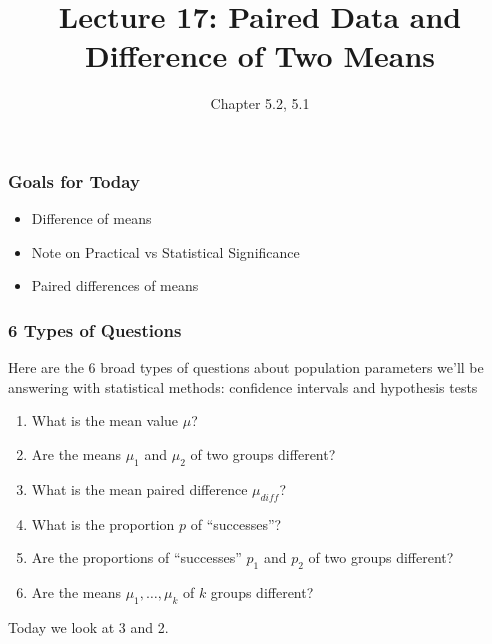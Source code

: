 \documentclass[handout]{beamer}
\title{Lecture 17: Paired Data and Difference of Two Means}
\author{Chapter 5.2, 5.1}
\date{}
\newcommand{\blue}[1]{\textcolor{blue2}{#1}}
\begin{document}
\begin{frame}
\titlepage
\end{frame}


\begin{frame}[fragile]
\frametitle{Goals for Today}

\begin{itemize}
\item Difference of means
\item Note on Practical vs Statistical Significance
\item Paired differences of means
\end{itemize}

\end{frame}


\begin{frame}
\frametitle{6 Types of Questions}

Here are the 6 broad types of questions about \blue{population parameters} we'll be answering with statistical methods:  confidence intervals and hypothesis tests 

\vspace{0.25cm}

\begin{enumerate}
\pause\item What is the mean value $\mu$?
\pause\item Are the means $\mu_1$ and $\mu_2$ of two groups different?
\pause\item What is the mean paired difference $\mu_{diff}$?
\pause\item What is the proportion $p$ of ``successes''?
\pause\item Are the proportions of ``successes'' $p_1$ and $p_2$ of two groups different?
\pause\item Are the means $\mu_1, \ldots, \mu_k$ of $k$ groups different?
\end{enumerate}

\pause Today we look at 3 and 2.
\end{frame}
\end{document}
